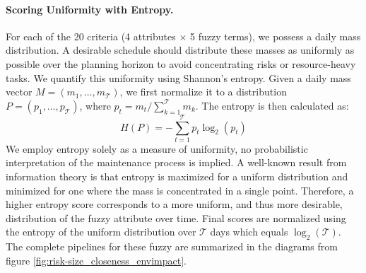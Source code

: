 \paragraph{Scoring Uniformity with Entropy.}
For each of the 20 criteria (4 attributes $\times$ 5 fuzzy terms), we possess a daily mass distribution. A desirable schedule should distribute these masses as uniformly as possible over the planning horizon to avoid concentrating risks or resource-heavy tasks. We quantify this uniformity using Shannon's entropy. Given a daily mass vector $M = (m_1, \dots, m_\mathcal{T})$, we first normalize it to a distribution $P = (p_1, \dots, p_\mathcal{T})$, where $p_t = m_t / \sum_{k=1}^\mathcal{T} m_k$. The entropy is then calculated as:
\[
H(P) = - \sum_{t=1}^{\mathcal{T}} p_t \log_2(p_t)
\]
We employ entropy solely as a measure of uniformity, no probabilistic interpretation of the maintenance process is implied. A well-known result from  information theory \cite{Entropy} is that entropy is maximized for a uniform distribution and minimized for one where the mass is concentrated in a single point. Therefore, a higher entropy score corresponds to a more uniform, and thus more desirable, distribution of the fuzzy attribute over time. Final scores are normalized using the entropy of the uniform distribution over $\mathcal{T}$ days which equals $\log_2(\mathcal{T})$.\\

The complete pipelines for these fuzzy are summarized in the diagrams from figure \ref{fig:risk-size_closeness_envimpact}.



